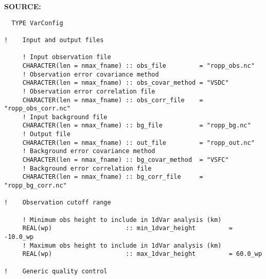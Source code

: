 \textbf{SOURCE:}\hspace{0.08in}\begin{Verbatim}
  TYPE VarConfig

!    Input and output files

     ! Input observation file
     CHARACTER(len = nmax_fname) :: obs_file         = "ropp_obs.nc"      
     ! Observation error covariance method
     CHARACTER(len = nmax_fname) :: obs_covar_method = "VSDC"             
     ! Observation error correlation file
     CHARACTER(len = nmax_fname) :: obs_corr_file    = "ropp_obs_corr.nc" 
     ! Input background file
     CHARACTER(len = nmax_fname) :: bg_file          = "ropp_bg.nc"       
     ! Output file
     CHARACTER(len = nmax_fname) :: out_file         = "ropp_out.nc"      
     ! Background error covariance method
     CHARACTER(len = nmax_fname) :: bg_covar_method  = "VSFC"             
     ! Background error correlation file
     CHARACTER(len = nmax_fname) :: bg_corr_file     = "ropp_bg_corr.nc"  

!    Observation cutoff range

     ! Minimum obs height to include in 1dVar analysis (km)
     REAL(wp)                    :: min_1dvar_height         = -10.0_wp 
     ! Maximum obs height to include in 1dVar analysis (km)
     REAL(wp)                    :: max_1dvar_height         = 60.0_wp   

!    Generic quality control


\end{Verbatim}
